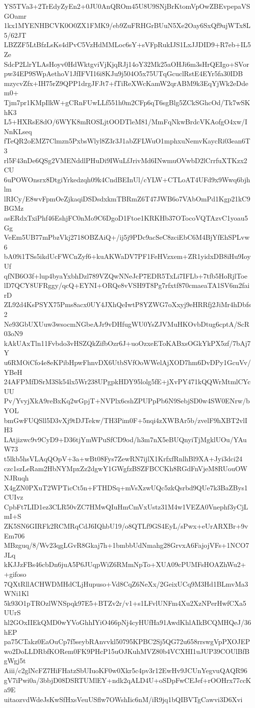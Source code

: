 YS5TVa3+2TrEdyZyEn2+0JU0AnQROm45U8U9SNjBrKtomVpOwZBEvpepaVSGOamr
1kx1MYENHBCVK0O0ZX1FMK9/eb9ZuFRHGrBUuN5Xe2Oay6SxQf9ujWTx8L5/62JT
LBZZF5LtBfzLsKs4dPvC5VzHdMMLoc6sY+sVFpRukIJS1LxJJDID9+R7eb+IL5Ze
SdcP2LlrYLAsHoyv0HdWktgviVjKjqRJj14oY32Mk25aOHJi6m3sHrQEIgo+SVor
pw34EP9SWpAethoV1JfIFVI16i8KJu9j504O5x75UTqGcuclRstE4EYr5fa30IDB
mzycvZfx+IH75rZ9QPP1drgJFJt7+fTiReXWcKamW2qrABM9k3EqYjWk2eDdem0+
Tjm7pr1KMpIlkW+gCRnFUwLLf551h0m2CFp6qT6sgBlg5ZCkSGhcOd/Tk7wSKhK3
L5+HXRsE8dO/6WYK8mROSLjtOODTleM81/MmFqNkwBrdcVKAofgO4xw/INnKLseq
fTeQR2oEMZ7Clmzn5PxbsWlyl8Z3r3J1abZFLWuO1mphxuNemvKaycRi03ean6T3
rl5F43nDe6QSg2VMENddlPHuDi9IWuLfJrivMd6INwmuOVwbD2lCrrfuXTKzx2CU
6uPOWOnsrx8DtgiYrkedzqh09k4CndBEInUl/cYLW+CTLoAT4UFd9x9Wwq6bjhlm
lRICy/E8wvFpmOeZjkaqiDSDsdxkmTBRmZ6T47JWB6o7VAbOmPd1Kgp21kC9BGMz
asERdxTxiPhf46EshjFC0nMo9C6DgoD1Ftoe1KRKHb37OTocoVQTAzvC1yoau5Gg
VeEm5UB77mPbzVkj2718OBZAiQ+/ij5j9PDc9acSeC8zciEbC6M4BjYfEhSPLvw6
bA09i1TSs5ikdUcFWCnZyf6+kuAKWaDV7PF1FeHVzxem+ZR1yidxDB8iHu9IoyUf
qfNB6O3f+lup4byaYxbhDzl789VZQwNNeJcP7EDR5TxLi7IFLb+7tfb5HoRjlToe
lD7QCY8UFRggy/qcQ+EYNI+ORQe8vVSH9T8Pg7rfxtf870cmaeaTA1SV6m2fairD
ZL92d4KsPSYX75Pms8acx0UY4JXhQeIwtP8YZWG7oXxyj9eHRRfj2JiMr4hDbfs2
Ne93GbUXUuw3wsocmNGbeAJr9vDHfugWU0YsZJVMuHKOvbDtug6cptA/ScR03oN9
kAkUAxTln11Fvbdo3vHSZQkZifbOzr6J+uoOzxeEToKABxsOGkYkPX5zf/7bAj7Y
u6RMOiCfo4e8eKPibHpwFhnvDX6UtbSVfOoWWelAjXOD7hm6DvDPy1GcuVv/YBeH
24AFPMfDSrM3Sk54lx5Wr238UPgpkHDY95lolg5fE+jXvPY471kQQWrMtmlCYcUU
Pv/YvyjXkA9reBxKq2wGpjT+NVPlx6cshZPUPpPb6N9SebjSD0w4SW0ENrw/bYOL
bmGwFUQSll5D3vXj9tDJTekw/TH3Pim0F+5nqi4zXWBAr5b/zvelF9hXBT2vlIH3
LAtjizwc9v9CyD9+D36tjYmWPuSfCD9od/h3m7nX5eBUQnyiTjMgklUOu/YAuW73
t5lkb5hsVLAqQOpV+3a+wBt08Fys7ZewRN7ijlX1KrfxfRnlhBl9XA+Jyi3dci24
czc1szLeRam2HbNYMpxZz2dgwY1GWgfzBSZFBCCKh8RGdFnVjeM8RUouOWNJRuqh
X4gZN0PXuT2WPTicCt5n+FTHDSq+mVsXzwUQc5zkQsrbd9QUe7k3BaZBys1CUIvz
CpbFt7LID1ez3CLR50vZC7HMwQIuHmCmVxUstz31M4w1VEZA0Vnephf3yCjLmI+S
ZK5SN6GIRFk2RCMRqCdJ6IQhbU19/o8QTLf9GS4EyL/sPwx+eUrARXBr+9vEm706
MBzguq/8/Wv23qgLGvR8Gkaj7h+1bmbbUdNmahg28GrvxA6FajojVFs+1NCO7JLq
kKJJzFBs46cbDn6juA5P6JUqpWiZ6RMmNpTo+XUA09cPUMFsHOAZhWu2++gifoso
7QXtRllACHWDMHdCLjHupuso+Vd8CqZ6NeXx/2GeixUCq9M3Hd1BLmvMa3WNi1Kl
5k93O1pTROzlWNSpqk97E5+BTZv2r/v1+s1LFvlUNFm4Xu2XzNPerHwfCXa5UUrS
hl2GOxIIEkQMD0wYVoGhhIYiO466pNj4cyHUfHa91AwdKhlAIkBCQMHQeJ/36hEP
pa75CTakz0EaOuCp7f5seybRAnvvkl50795KPBC2Sj5QG72u658rrswgVpPXOJEP
wo2DoLLDRbfKORem0FK9PHcP15uOJKuhMVZ80b4VCXHI1uJUP39COUlBfBgWgj5t
Aiii/c2glNcFZ7HiFHatzSbUIuoKF0w0Xkr5c4pv3r12EwHv9JCUnYegvuQAQR96
gV7iPwi0a/3bbjD08DSRTUMlEY+ndk2qALD4U+oSDpFwCEJef+rOOHrx77ccKa9E
uitaozvdWdeJsKwSfHxsVeuUSflw7OWshIic6nM/iR9jq1bQIBVTgCawvi3D6Xvi
